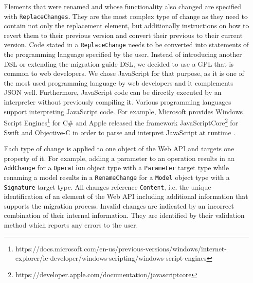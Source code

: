 Elements that were renamed and whose functionality also changed are specified with \texttt{Replace\-Changes}. They are the most complex type of change as they need to contain not only the replacement element, but additionally instructions on how to revert them to their previous version and convert their previous to their current version. Code stated in a \texttt{Replace\-Change} needs to be converted into statements of the programming language specified by the user. Instead of introducing another \ac{DSL} or extending the migration guide \ac{DSL}, we decided to use a \ac{GPL} that is common to web developers. We chose JavaScript for that purpose, as it is one of the most used programming language by web developers and it complements \ac{JSON} well. Furthermore, JavaScript code can be directly executed by an interpreter without previously compiling it. Various programming languages support interpreting JavaScript code. For example, Microsoft provides Windows Script Engines\footnote{https://docs.microsoft.com/en-us/previous-versions/windows/internet-explorer/ie-developer/windows-scripting/windows-script-engines} for C\# and Apple released the framework JavaScriptCore\footnote{https://developer.apple.com/documentation/javascriptcore} for Swift and Objective-C in order to parse and interpret JavaScript at runtime .

Each type of change is applied to one object of the Web API and targets one property of it. For example, adding a parameter to an operation results in an \texttt{Add\-Change} for a \texttt{Operation} object type with a \texttt{Parameter} target type while renaming a model results in a \texttt{Rename\-Change} for a \texttt{Model} object type with a \texttt{Signature} target type. All changes reference \texttt{Content}, i.e. the unique identification of an element of the Web API including additional information that supports the migration process. Invalid changes are indicated by an incorrect combination of their internal information. They are identified by their validation method which reports any errors to the user.

\begin{figure}[!h]
\end{figure}

